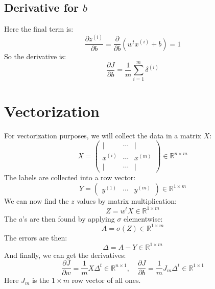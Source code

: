 \documentclass[12pt, a4paper]{article}
\numberwithin{equation}{section}
\begin{document}
\subsection{Derivative for $b$}
Here the final term is:
\begin{equation}
\frac{\partial z^{(i)}}{\partial b}=\frac{\partial}{\partial b}\left(w^t x^{(i)}+b\right)=1
\end{equation}
So the derivative is:
\begin{equation}
\frac{\partial J}{\partial b}=\frac{1}{m}\sum_{i=1}^m\delta^{(i)}
\end{equation}

\section{Vectorization}
For vectorization purposes, we will collect the data in a matrix $X$:
\begin{equation}
X=\begin{pmatrix}
| & \cdots & | \\
x^{(i)} & \cdots & x^{(m)} \\
| & \cdots & |
\end{pmatrix}
\in\mathbb{R}^{n\times m}
\end{equation}
The labels are collected into a row vector:
\begin{equation}
Y=\begin{pmatrix}
y^{(1)} & \cdots & y^{(m)}
\end{pmatrix}
\in\mathbb{R}^{1\times m}
\end{equation}
We can now find the $z$ values by matrix multiplication:
\begin{equation}
Z=w^t X\in\mathbb{R}^{1\times m}
\end{equation}
The $a$'s are then found by applying $\sigma$ elementwise:
\begin{equation}
A=\sigma(Z)\in\mathbb{R}^{1\times m}
\end{equation}
The errors are then:
\begin{equation}
\Delta=A-Y\in\mathbb{R}^{1\times m}
\end{equation}
And finally, we can get the derivatives:
\begin{equation}
\frac{\partial J}{\partial w}=\frac{1}{m}X\Delta^t\in\mathbb{R}^{n\times 1},\quad
\frac{\partial J}{\partial b}=\frac{1}{m}J_m\Delta^t\in\mathbb{R}^{1\times 1}
\end{equation}
Here $J_m$ is the $1\times m$ row vector of all ones.
\end{document}
